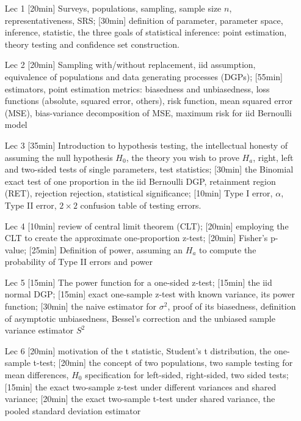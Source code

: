 \begin{enumerate}
\item[Lec 1] [20min] Surveys, populations, sampling, sample size $n$, representativeness, SRS; [30min] definition of parameter, parameter space, inference, statistic, the three goals of statistical inference: point estimation, theory testing and confidence set construction. 

\item[Lec 2] [20min] Sampling with/without replacement, iid assumption, equivalence of populations and data generating processes (DGPs); [55min] estimators, point estimation metrics: biasedness and unbiasedness, loss functions (absolute, squared error, others), risk function, mean squared error (MSE), bias-variance decomposition of MSE, maximum risk for iid Bernoulli model

\item[Lec 3] [35min] Introduction to hypothesis testing, the intellectual honesty of assuming the null hypothesis $H_0$, the theory you wish to prove $H_a$, right, left and two-sided tests of single parameters, test statistics; [30min] the Binomial exact test of one proportion in the iid Bernoulli DGP, retainment region (RET), rejection rejection, statistical significance; [10min] Type I error, $\alpha$, Type II error, $2 \times 2$ confusion table of testing errors.

\item[Lec 4] [10min] review of central limit theorem (CLT); [20min] employing the CLT to create the approximate one-proportion z-test; [20min] Fisher's p-value; [25min] Definition of power, assuming an $H_a$ to compute the probability of Type II errors and power

\item[Lec 5] [15min] The power function for a one-sided z-test; [15min] the iid normal DGP; [15min] exact one-sample z-test with known variance, its power function; [30min] the naive estimator for $\sigma^2$, proof of its biasedness, definition of asymptotic unbiasedness, Bessel's correction and the unbiased sample variance estimator $S^2$

\item[Lec 6] [20min] motivation of the t statistic, Student's t distribution, the one-sample t-test; [20min] the concept of two populations, two sample testing for mean differences, $H_0$ specification for left-sided, right-sided, two sided tests; [15min] the exact two-sample z-test under different variances and shared variance; [20min] the exact two-sample t-test under shared variance, the pooled standard deviation estimator


\end{enumerate}
